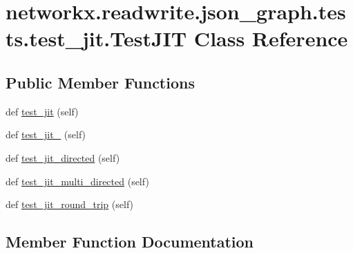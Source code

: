 \hypertarget{classnetworkx_1_1readwrite_1_1json__graph_1_1tests_1_1test__jit_1_1TestJIT}{}\section{networkx.\+readwrite.\+json\+\_\+graph.\+tests.\+test\+\_\+jit.\+Test\+J\+IT Class Reference}
\label{classnetworkx_1_1readwrite_1_1json__graph_1_1tests_1_1test__jit_1_1TestJIT}
\subsection*{Public Member Functions}
\begin{DoxyCompactItemize}
\item 
def \hyperlink{classnetworkx_1_1readwrite_1_1json__graph_1_1tests_1_1test__jit_1_1TestJIT_aa661ae896715879ce20d07e91099cbe2}{test\+\_\+jit} (self)
\item 
def \hyperlink{classnetworkx_1_1readwrite_1_1json__graph_1_1tests_1_1test__jit_1_1TestJIT_adbea9ec9511db22e06322cd5a05fd43d}{test\+\_\+jit\+\_} (self)
\item 
def \hyperlink{classnetworkx_1_1readwrite_1_1json__graph_1_1tests_1_1test__jit_1_1TestJIT_a1ae6dab4dcb18099d54889a68d87d44e}{test\+\_\+jit\+\_\+directed} (self)
\item 
def \hyperlink{classnetworkx_1_1readwrite_1_1json__graph_1_1tests_1_1test__jit_1_1TestJIT_aa0524901ed710ca236c19d17ba671eae}{test\+\_\+jit\+\_\+multi\+\_\+directed} (self)
\item 
def \hyperlink{classnetworkx_1_1readwrite_1_1json__graph_1_1tests_1_1test__jit_1_1TestJIT_addcd00a244f3c33c8881e6b10c233e51}{test\+\_\+jit\+\_\+round\+\_\+trip} (self)
\end{DoxyCompactItemize}


\subsection{Member Function Documentation}
\mbox{\label{classnetworkx_1_1readwrite_1_1json__graph_1_1tests_1_1test__jit_1_1TestJIT_aa661ae896715879ce20d07e91099cbe2}} 
